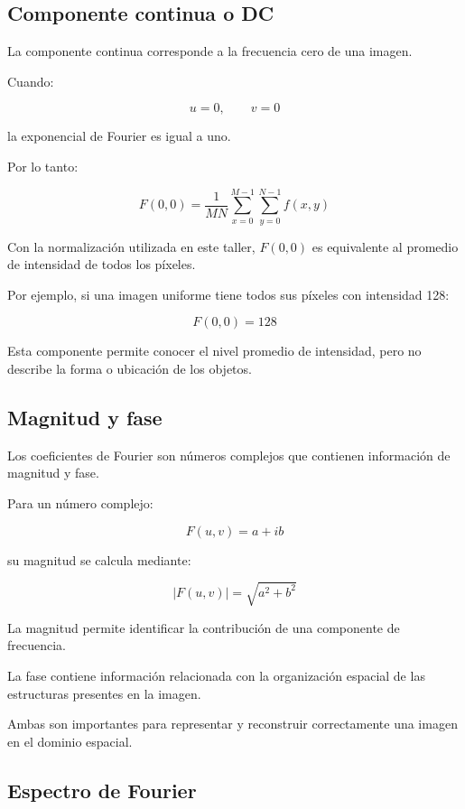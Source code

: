 \documentclass[11pt,letterpaper]{article}
\begin{document}
\subsection{Componente continua o DC}

La componente continua corresponde a la frecuencia
cero de una imagen.

Cuando:

\[
u=0,\qquad v=0
\]

la exponencial de Fourier es igual a uno.

Por lo tanto:

\begin{equation}
F(0,0)=
\frac{1}{MN}
\sum_{x=0}^{M-1}
\sum_{y=0}^{N-1}
f(x,y)
\end{equation}

Con la normalización utilizada en este taller,
$F(0,0)$ es equivalente al promedio de intensidad
de todos los píxeles.

Por ejemplo, si una imagen uniforme tiene todos
sus píxeles con intensidad 128:

\[
F(0,0)=128
\]

Esta componente permite conocer el nivel promedio
de intensidad, pero no describe la forma o ubicación
de los objetos.

\subsection{Magnitud y fase}

Los coeficientes de Fourier son números complejos
que contienen información de magnitud y fase.

Para un número complejo:

\[
F(u,v)=a+ib
\]

su magnitud se calcula mediante:

\begin{equation}
|F(u,v)|=\sqrt{a^2+b^2}
\end{equation}

La magnitud permite identificar la contribución
de una componente de frecuencia.

La fase contiene información relacionada con
la organización espacial de las estructuras
presentes en la imagen.

Ambas son importantes para representar
y reconstruir correctamente una imagen
en el dominio espacial.

\subsection{Espectro de Fourier}
\end{document}
